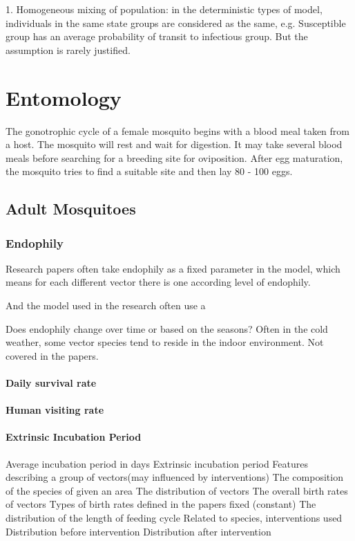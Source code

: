 \documentclass[a4paper, 12pt, twoside]{article}
\begin{document}
1. Homogeneous mixing of population: in the deterministic types of model, individuals in the same state groups are considered as the same, e.g. Susceptible group has an average probability of transit to infectious group. But the assumption is rarely justified.



\section{Entomology}

The gonotrophic cycle of a female mosquito begins with a blood meal taken from a host. The mosquito will rest and wait for digestion. It may take several blood meals before searching for a breeding site for oviposition. After egg maturation, the mosquito tries to find a suitable site and then lay 80 - 100 eggs.

\subsection{Adult Mosquitoes}

\subsubsection{Endophily}
Research papers often take endophily as a fixed parameter in the model, which means for each different vector there is one according level of endophily.

And the model used in the research often use a 

Does endophily change over time or based on the seasons? Often in the cold weather, some vector species tend to reside in the indoor environment. Not covered in the papers.


\paragraph{Daily survival rate}

\paragraph{Human visiting rate}

\paragraph{Extrinsic Incubation Period}
Average incubation period in days
Extrinsic incubation period
Features describing a group of vectors(may influenced by interventions)
The composition of the species of given an area
The distribution of vectors
The overall birth rates of vectors
	Types of birth rates defined in the papers
fixed (constant)
The distribution of the length of feeding cycle
Related to species, interventions used
Distribution before intervention
Distribution after intervention
\end{document}
